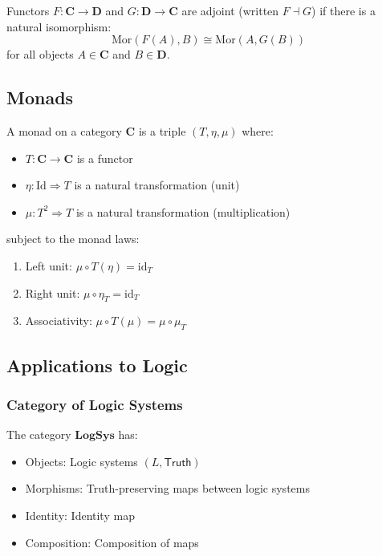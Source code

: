 \begin{definition}
Functors $F: \mathbf{C} \to \mathbf{D}$ and $G: \mathbf{D} \to \mathbf{C}$ are adjoint (written $F \dashv G$) if there is a natural isomorphism:
$$\text{Mor}(F(A), B) \cong \text{Mor}(A, G(B))$$
for all objects $A \in \mathbf{C}$ and $B \in \mathbf{D}$.
\end{definition}

\subsection{Monads}

\begin{definition}[Monad]
A monad on a category $\mathbf{C}$ is a triple $(T, \eta, \mu)$ where:
\begin{itemize}
\item $T: \mathbf{C} \to \mathbf{C}$ is a functor
\item $\eta: \text{Id} \Rightarrow T$ is a natural transformation (unit)
\item $\mu: T^2 \Rightarrow T$ is a natural transformation (multiplication)
\end{itemize}
subject to the monad laws:
\begin{enumerate}
\item Left unit: $\mu \circ T(\eta) = \text{id}_T$
\item Right unit: $\mu \circ \eta_T = \text{id}_T$
\item Associativity: $\mu \circ T(\mu) = \mu \circ \mu_T$
\end{enumerate}
\end{definition}

\subsection{Applications to Logic}

\subsubsection{Category of Logic Systems}

\begin{definition}
The category $\mathbf{LogSys}$ has:
\begin{itemize}
\item Objects: Logic systems $(L, \mathsf{Truth})$
\item Morphisms: Truth-preserving maps between logic systems
\item Identity: Identity map
\item Composition: Composition of maps
\end{itemize}
\end{definition}

